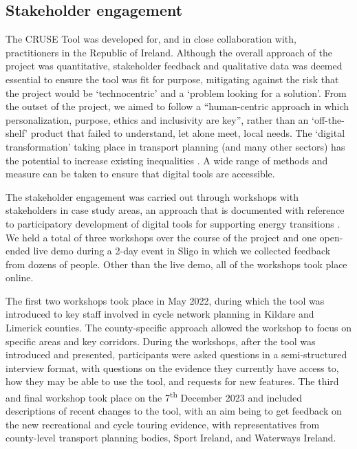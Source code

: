 \documentclass[
  super,
  preprint,
  3p]{elsarticle}
\begin{document}
\subsection{Stakeholder engagement}\label{sec-stakeholder-engagement}

The CRUSE Tool was developed for, and in close collaboration with,
practitioners in the Republic of Ireland. Although the overall approach
of the project was quantitative, stakeholder feedback and qualitative
data was deemed essential to ensure the tool was fit for purpose,
mitigating against the risk that the project would be `technocentric'
and a `problem looking for a solution'. From the outset of the project,
we aimed to follow a ``human-centric approach in which personalization,
purpose, ethics and inclusivity are key'', rather than an
`off-the-shelf' product that failed to understand, let alone meet, local
needs. The `digital transformation' taking place in transport planning
(and many other sectors) has the potential to increase existing
inequalities \citep{coppola2022}. A wide range of methods and measure
can be taken to ensure that digital tools are accessible.

The stakeholder engagement was carried out through workshops with
stakeholders in case study areas, an approach that is documented with
reference to participatory development of digital tools for supporting
energy transitions \citep{hewitt2020}. We held a total of three
workshops over the course of the project and one open-ended live demo
during a 2-day event in Sligo in which we collected feedback from dozens
of people. Other than the live demo, all of the workshops took place
online.

The first two workshops took place in May 2022, during which the tool
was introduced to key staff involved in cycle network planning in
Kildare and Limerick counties. The county-specific approach allowed the
workshop to focus on specific areas and key corridors. During the
workshops, after the tool was introduced and presented, participants
were asked questions in a semi-structured interview format, with
questions on the evidence they currently have access to, how they may be
able to use the tool, and requests for new features. The third and final
workshop took place on the 7\textsuperscript{th} December 2023 and
included descriptions of recent changes to the tool, with an aim being
to get feedback on the new recreational and cycle touring evidence, with
representatives from county-level transport planning bodies, Sport
Ireland, and Waterways Ireland.
\end{document}
